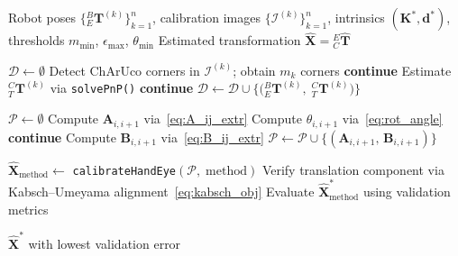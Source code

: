 \begin{algorithm}
	\caption{Extrinsic hand-eye calibration pipeline}
	\label{alg:extrinsic}
	\begin{algorithmic}[1]
		\Require Robot poses $\{{}^B_E\mathbf{T}^{(k)}\}_{k=1}^{n}$,
		calibration images $\{\mathcal{I}^{(k)}\}_{k=1}^{n}$,
		intrinsics $(\mathbf{K}^*, \mathbf{d}^*)$,
		thresholds $m_{\min}$, $\epsilon_{\max}$, $\theta_{\min}$
		\Ensure  Estimated transformation $\hat{\mathbf{X}} = {}^E_C\hat{\mathbf{T}}$
		
		\State $\mathcal{D} \leftarrow \emptyset$
		\State Detect ChArUco corners in $\mathcal{I}^{(k)}$; obtain $m_k$ corners
		 \textbf{continue} \EndIf
		\State Estimate ${}^C_T\mathbf{T}^{(k)}$ via \texttt{solvePnP()}
		 \textbf{continue} \EndIf
		\State $\mathcal{D} \leftarrow \mathcal{D} \cup
		\bigl\{\bigl({}^B_E\mathbf{T}^{(k)},\;
		{}^C_T\mathbf{T}^{(k)}\bigr)\bigr\}$
		\EndFor
		
		\State $\mathcal{P} \leftarrow \emptyset$
		\State Compute $\mathbf{A}_{i,i+1}$ via~\eqref{eq:A_ij_extr}
		\State Compute $\theta_{i,i+1}$ via~\eqref{eq:rot_angle}
		 \textbf{continue} \EndIf
		\State Compute $\mathbf{B}_{i,i+1}$ via~\eqref{eq:B_ij_extr}
		\State $\mathcal{P} \leftarrow \mathcal{P} \cup
		\{(\mathbf{A}_{i,i+1},\, \mathbf{B}_{i,i+1})\}$
		\EndFor
		
		\State $\hat{\mathbf{X}}_{\text{method}} \leftarrow$
		\texttt{calibrateHandEye}$(\mathcal{P},\; \text{method})$
		\State Verify translation component via
		Kabsch--Umeyama alignment~\eqref{eq:kabsch_obj}
		\State Evaluate $\hat{\mathbf{X}}^*_{\text{method}}$ using
		validation metrics
		\EndFor
		
		\State \Return $\hat{\mathbf{X}}^*$ with lowest validation error
		
	\end{algorithmic}
\end{algorithm}

